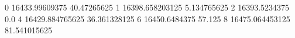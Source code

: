 0 16433.99609375 40.47265625
1 16398.658203125 5.134765625
2 16393.5234375 0.0
4 16429.884765625 36.361328125
6 16450.6484375 57.125
8 16475.064453125 81.541015625
